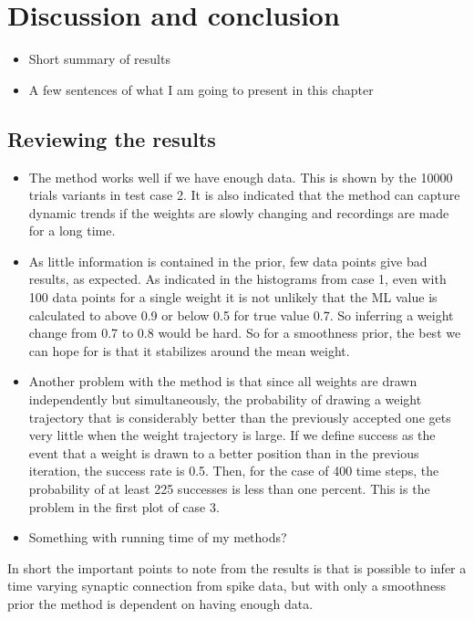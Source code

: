 
\chapter{Discussion and conclusion}
\label{ch:6}

\begin{itemize}
    \item Short summary of results
    \item A few sentences of what I am going to present in this chapter
\end{itemize}

\section{Reviewing the results}

\begin{itemize}
    \item The method works well if we have enough data. This is shown by the 10000 trials variants in test case 2. It is also indicated that the method can capture dynamic trends if the weights are slowly changing and recordings are made for a long time.
    \item As little information is contained in the prior, few data points give bad results, as expected. As indicated in the histograms from case 1, even with 100 data points for a single weight it is not unlikely that the ML value is calculated to above 0.9 or below 0.5 for true value 0.7. So inferring a weight change from 0.7 to 0.8 would be hard. So for a smoothness prior, the best we can hope for is that it stabilizes around the mean weight. 
    \item Another problem with the method is that since all weights are drawn independently but simultaneously, the probability of drawing a weight trajectory that is considerably better than the previously accepted one gets very little when the weight trajectory is large. If we define success as the event that a weight is drawn to a better position than in the previous iteration, the success rate is 0.5. Then, for the case of 400 time steps, the probability of at least 225 successes is less than one percent. This is the problem in the first plot of case 3.  
    \item Something with running time of my methods?
\end{itemize}
In short the important points to note from the results is that is possible to infer a time varying synaptic connection from spike data, but with only a smoothness prior the method is dependent on having enough data. 



